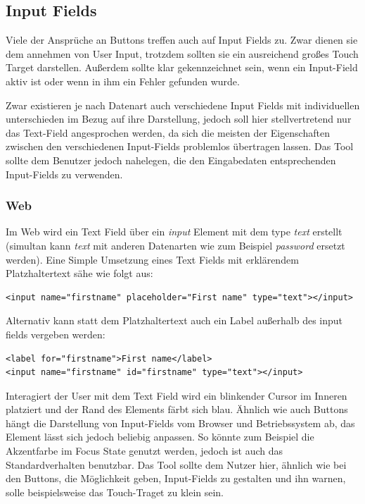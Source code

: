 \subsection{Input Fields}
Viele der Ansprüche an Buttons treffen auch auf Input Fields zu. Zwar dienen sie dem annehmen von User Input, trotzdem sollten sie ein ausreichend großes Touch Target darstellen.  Außerdem sollte klar gekennzeichnet sein, wenn ein Input-Field aktiv ist oder wenn in ihm ein Fehler gefunden wurde.

Zwar existieren je nach Datenart auch verschiedene Input Fields mit individuellen unterschieden im Bezug auf ihre Darstellung, jedoch soll hier stellvertretend nur das Text-Field angesprochen werden, da sich die meisten der Eigenschaften zwischen den verschiedenen Input-Fields problemlos übertragen lassen. Das Tool sollte dem Benutzer jedoch nahelegen, die den Eingabedaten entsprechenden Input-Fields zu verwenden.

\subsubsection{Web}
Im Web wird ein Text Field über ein \textit{input} Element mit dem type \textit{text} erstellt (simultan kann \textit{text} mit anderen Datenarten wie zum Beispiel \textit{password} ersetzt werden). Eine Simple Umsetzung eines Text Fields mit erklärendem Platzhaltertext sähe wie folgt aus:

\begin{lstlisting}
<input name="firstname" placeholder="First name" type="text"></input>
\end{lstlisting}

Alternativ kann statt dem Platzhaltertext auch ein Label außerhalb des input fields vergeben werden:

\begin{lstlisting}
<label for="firstname">First name</label>
<input name="firstname" id="firstname" type="text"></input>
\end{lstlisting}

Interagiert der User mit dem Text Field wird ein blinkender Cursor im Inneren platziert und der Rand des Elements färbt sich blau.  Ähnlich wie auch Buttons hängt die Darstellung von Input-Fields vom Browser und Betriebssystem ab, das Element lässt sich jedoch beliebig anpassen. So könnte zum Beispiel die Akzentfarbe im Focus State genutzt werden, jedoch ist auch das Standardverhalten benutzbar. Das Tool sollte dem Nutzer hier, ähnlich wie bei den Buttons, die Möglichkeit geben, Input-Fields zu gestalten und ihn warnen, solle beispielsweise das Touch-Traget zu klein sein.

